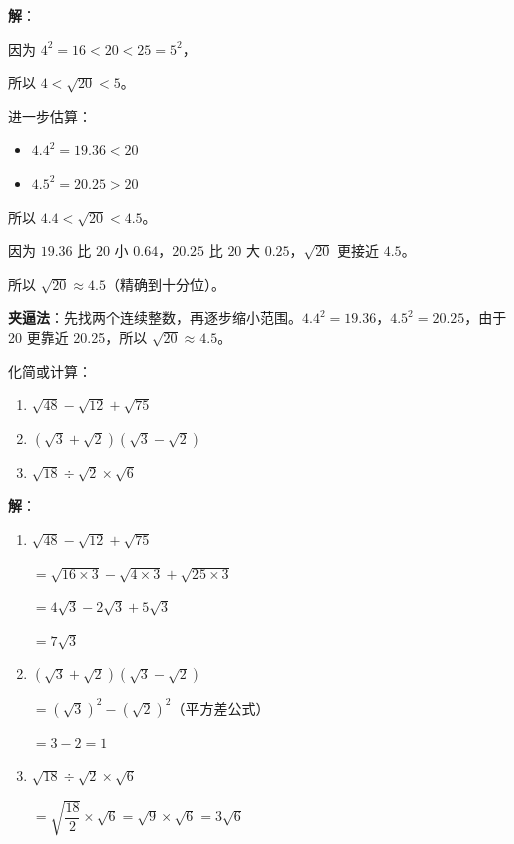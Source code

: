 \documentclass[12pt, a4paper]{ctexart}
\begin{document}
\textbf{解}：

因为 $4^2 = 16 < 20 < 25 = 5^2$，

所以 $4 < \sqrt{20} < 5$。

进一步估算：
\begin{itemize}[leftmargin=2em]
  \item $4.4^2 = 19.36 < 20$
  \item $4.5^2 = 20.25 > 20$
\end{itemize}

所以 $4.4 < \sqrt{20} < 4.5$。

因为 $19.36$ 比 $20$ 小 $0.64$，$20.25$ 比 $20$ 大 $0.25$，$\sqrt{20}$ 更接近 $4.5$。

所以 $\sqrt{20} \approx 4.5$（精确到十分位）。

\begin{tipbox}[估算方法]
\textbf{夹逼法}：先找两个连续整数，再逐步缩小范围。$4.4^2 = 19.36$，$4.5^2 = 20.25$，由于 20 更靠近 20.25，所以 $\sqrt{20} \approx 4.5$。
\end{tipbox}

\vspace{6pt}

\begin{examplebox}[【例题5】根式的化简与运算]
化简或计算：
\begin{enumerate}[label=(\arabic*)]
  \item $\sqrt{48} - \sqrt{12} + \sqrt{75}$
  \item $(\sqrt{3} + \sqrt{2})(\sqrt{3} - \sqrt{2})$
  \item $\sqrt{18} \div \sqrt{2} \times \sqrt{6}$
\end{enumerate}
\end{examplebox}

\textbf{解}：

\begin{enumerate}[label=(\arabic*)]
  \item $\sqrt{48} - \sqrt{12} + \sqrt{75}$

  $= \sqrt{16 \times 3} - \sqrt{4 \times 3} + \sqrt{25 \times 3}$

  $= 4\sqrt{3} - 2\sqrt{3} + 5\sqrt{3}$

  $= 7\sqrt{3}$

  \item $(\sqrt{3} + \sqrt{2})(\sqrt{3} - \sqrt{2})$

  $= (\sqrt{3})^2 - (\sqrt{2})^2$（平方差公式）

  $= 3 - 2 = 1$

  \item $\sqrt{18} \div \sqrt{2} \times \sqrt{6}$

  $= \sqrt{\dfrac{18}{2}} \times \sqrt{6} = \sqrt{9} \times \sqrt{6} = 3\sqrt{6}$
\end{enumerate}
\end{document}
